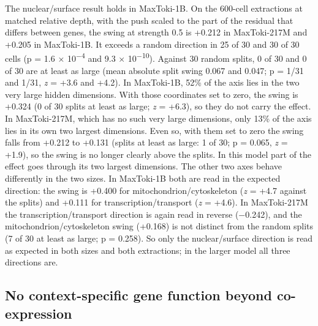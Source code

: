 \documentclass[
  11pt,
]{article}
\begin{document}
The nuclear/surface result holds in MaxToki-1B. On the 600-cell
extractions at matched relative depth, with the push scaled to the part
of the residual that differs between genes, the swing at strength 0.5 is
+0.212 in MaxToki-217M and +0.205 in MaxToki-1B. It exceeds a random
direction in 25 of 30 and 30 of 30 cells (p = 1.6 ×
10\textsuperscript{−4} and 9.3 × 10\textsuperscript{−10}). Against 30
random splits, 0 of 30 and 0 of 30 are at least as large (mean absolute
split swing 0.067 and 0.047; p = 1/31 and 1/31, \emph{z} = +3.6 and
+4.2). In MaxToki-1B, 52\% of the axis lies in the two very large hidden
dimensions. With those coordinates set to zero, the swing is +0.324 (0
of 30 splits at least as large; \emph{z} = +6.3), so they do not carry
the effect. In MaxToki-217M, which has no such very large dimensions,
only 13\% of the axis lies in its own two largest dimensions. Even so,
with them set to zero the swing falls from +0.212 to +0.131 (splits at
least as large: 1 of 30; p = 0.065, \emph{z} = +1.9), so the swing is no
longer clearly above the splits. In this model part of the effect goes
through its two largest dimensions. The other two axes behave
differently in the two sizes. In MaxToki-1B both are read in the
expected direction: the swing is +0.400 for mitochondrion/cytoskeleton
(\emph{z} = +4.7 against the splits) and +0.111 for
transcription/transport (\emph{z} = +4.6). In MaxToki-217M the
transcription/transport direction is again read in reverse (−0.242), and
the mitochondrion/cytoskeleton swing (+0.168) is not distinct from the
random splits (7 of 30 at least as large; p = 0.258). So only the
nuclear/surface direction is read as expected in both sizes and both
extractions; in the larger model all three directions are.

\subsection{No context-specific gene function beyond
co-expression}\label{no-context-specific-gene-function-beyond-co-expression}
\end{document}
